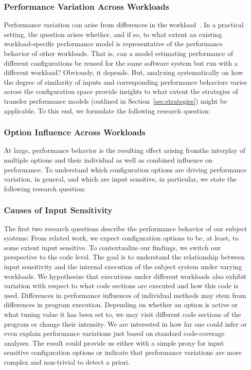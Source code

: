 {\subsubsection{Performance Variation Across Workloads}
Performance variation can arise from differences in the workload~\cite{benchmarking_book}. In a practical setting, the question arises whether, and if so, to what extent an existing workload-specific performance model is representative of the performance behavior of other workloads. 
That is, can a model estimating performance of different configurations be reused for the same software system but run with a different workload? 
Obviously, it depends. But, analyzing systematically on how the degree of similarity of inputs and corresponding performance behaviors varies across the configuration space provide insights to what extent the strategies of transfer performance models (outlined in Section~\ref{sec:strategies}) might be applicable.
To this end, we formulate the following research question: 

\subsubsection{Option Influence Across Workloads}
At large, performance behavior is the resulting effect arising fromthe interplay of multiple options and their individual as well as combined influence on performance. To understand which configuration options are driving performance variation, in general, and which are input sensitive, in particular, we state the following research question:

\subsubsection{Causes of Input Sensitivity}
The first two research questions describe the performance behavior of our subject systems: From related work, we expect configuration options to be, at least, to some extent input sensitive. To contextualize our findings, we switch our perspective to the code level. The goal is to understand the relationship between input sensitivity and the internal execution of the subject system under varying workloads. We hypothesize that executions under different workloads also exhibit variation with respect to what code sections are executed and how this code is used. 
Differences in performance influences of individual methods may stem from differences in program execution. Depending on whether an option is active or what tuning value it has been set to, we may visit different code sections of the program or change their intensity. We are interested in how far one could infer or even explain performance variations just based on standard code-coverage analyses. The result could provide us either with a simple proxy for input sensitive configuration options or indicate that performance variations are more complex and non-trivial to detect a priori.


}
